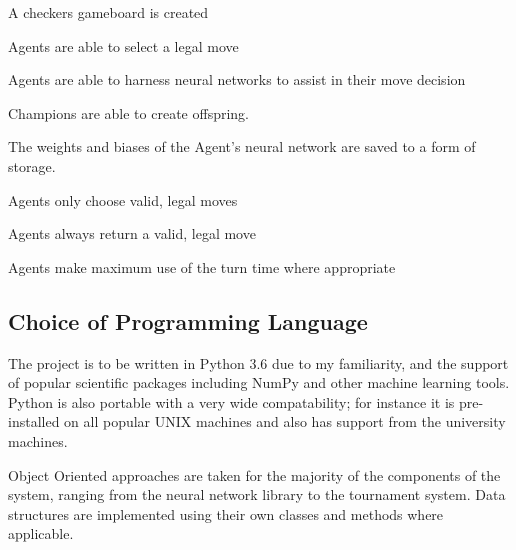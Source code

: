 \documentclass[12pt,a4paper]{article}
\begin{document}
A checkers gameboard is created

Agents are able to select a legal move

Agents are able to harness neural networks to assist in their move decision

Champions are able to create offspring.

The weights and biases of the Agent's neural network are saved to a form of storage.

Agents only choose valid, legal moves

Agents always return a valid, legal move

Agents make maximum use of the turn time where appropriate


\subsection*{Choice of Programming Language}

The project is to be written in Python 3.6 due to my familiarity, and the support of popular scientific packages including NumPy and other machine learning tools. Python is also portable with a very wide compatability; for instance it is pre-installed on all popular UNIX machines and also has support from the university machines.

Object Oriented approaches are taken for the majority of the components of the system, ranging from the neural network library to the tournament system. Data structures are implemented using their own classes and methods where applicable. 
\end{document}
